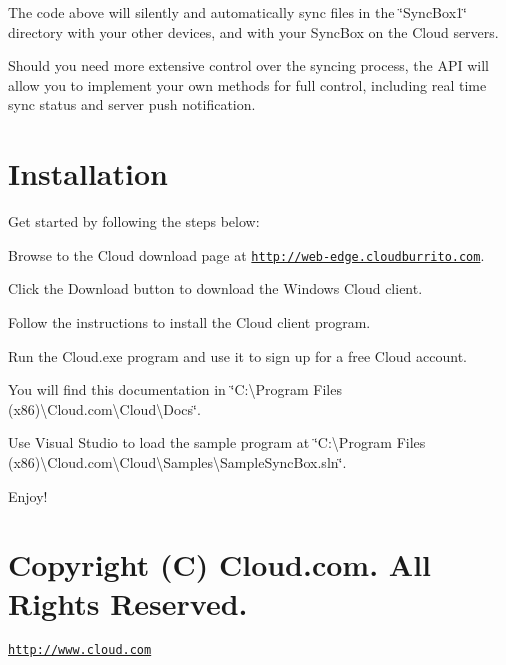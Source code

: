 The code above will silently and automatically sync files in the \char`\"{}\-Sync\-Box1\char`\"{} directory with your other devices, and with your Sync\-Box on the Cloud servers.

Should you need more extensive control over the syncing process, the A\-P\-I will allow you to implement your own methods for full control, including real time sync status and server push notification.\hypertarget{index_install_sec}{}\section{Installation}\label{index_install_sec}
Get started by following the steps below\-:
\begin{DoxyItemize}
\item Browse to the Cloud download page at \href{http://web-edge.cloudburrito.com}{\tt http\-://web-\/edge.\-cloudburrito.\-com}.
\item Click the Download button to download the Windows Cloud client.
\item Follow the instructions to install the Cloud client program.
\item Run the Cloud.\-exe program and use it to sign up for a free Cloud account.
\item You will find this documentation in \char`\"{}\-C\-:\textbackslash{}\-Program Files (x86)\textbackslash{}\-Cloud.\-com\textbackslash{}\-Cloud\textbackslash{}\-Docs\char`\"{}.
\item Use Visual Studio to load the sample program at \char`\"{}\-C\-:\textbackslash{}\-Program Files (x86)\textbackslash{}\-Cloud.\-com\textbackslash{}\-Cloud\textbackslash{}\-Samples\textbackslash{}\-Sample\-Sync\-Box.\-sln\char`\"{}.
\item Enjoy!
\end{DoxyItemize}\hypertarget{index_copyright_sec}{}\section{Copyright (\-C) Cloud.\-com.  All Rights Reserved.}\label{index_copyright_sec}
\href{http://www.cloud.com}{\tt http\-://www.\-cloud.\-com} 